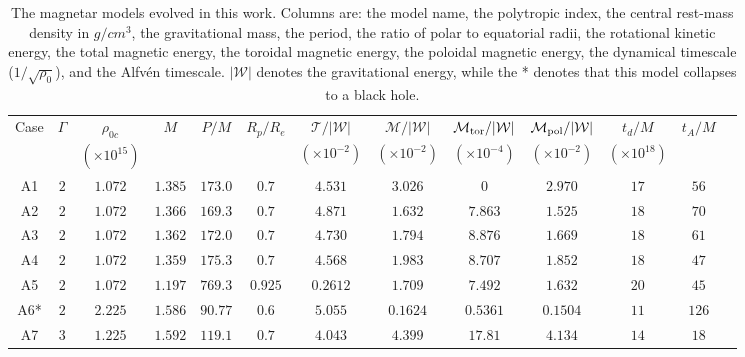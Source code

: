 \documentclass[twocolumn,superscriptaddress,showpacs,prl,aps,amsmath,amssymb,nofootinbib]{revtex4-1}
\newcommand{\GR}{\rho}
\begin{document}
\setlength{\tabcolsep}{5pt}                                                      
\begin{table*}[ht]
\caption{The magnetar models evolved in this work. Columns are: the model name,
the polytropic index, the central rest-mass density in $g/cm^3$, the gravitational mass,
the period, the ratio of polar to equatorial radii, the rotational kinetic
energy, the total magnetic energy, the toroidal magnetic energy, the poloidal
magnetic energy, the dynamical timescale
($1/\sqrt{\GR_0}$), and the Alfv\'en  timescale. $|\mathcal{W}|$ denotes the
gravitational energy, while the * denotes that this model collapses to a black
hole. }
\label{tab:models}
\begin{tabular}{ccccccccccccc}
\hline\hline
Case & $\Gamma$ & $\rho_{0c}$ & $M$  & $P/M$  & $R_p/R_e$ & $\mathcal{T}/|\mathcal{W}|$ & $\mathcal{M}/|\mathcal{W}|$  & 
$\mathcal{M}_{\rm tor}/|\mathcal{W}|$ & $\mathcal{M}_{\rm pol}/|\mathcal{W}|$ & $t_d/M$ & $t_A/M$   \\
     & & $(\times 10^{15})$ &  &  &   & $(\times 10^{-2})$ & $(\times 10^{-2})$ & $(\times 10^{-4})$ & $(\times 10^{-2})$  & $(\times 10^{18})$  & &   \\
\hline
A1 &  $2$ & $1.072$ & $1.385$ & $173.0$ & $0.7$   & $4.531$ & $3.026$  & $0$      & $2.970$   & $17$ & $56$   \\
A2 &  $2$ & $1.072$ & $1.366$ & $169.3$ & $0.7$   & $4.871$ & $1.632$  & $7.863$  & $1.525$   & $18$ & $70$  \\
A3 &  $2$ & $1.072$ & $1.362$ & $172.0$ & $0.7$   & $4.730$ & $1.794$  & $8.876$  & $1.669$   & $18$ & $61$  \\
A4 &  $2$ & $1.072$ & $1.359$ & $175.3$ & $0.7$   & $4.568$ & $1.983$  & $8.707$  & $1.852$   & $18$ & $47$  \\
A5 &  $2$ & $1.072$ & $1.197$ & $769.3$ & $0.925$ & $0.2612$& $1.709$  & $7.492$  & $1.632$   & $20$ & $45$   \\
A6*&  $2$ & $2.225$ & $1.586$ & $90.77$ & $0.6$   & $5.055$ & $0.1624$ & $0.5361$ & $0.1504$  & $11$ & $126$  \\
A7 &  $3$ & $1.225$ & $1.592$ & $119.1$ & $0.7$   & $4.043$ & $4.399$  & $17.81$  & $4.134$   & $14$ & $18$    \\
\hline\hline
\end{tabular}
\end{table*}
\end{document}
